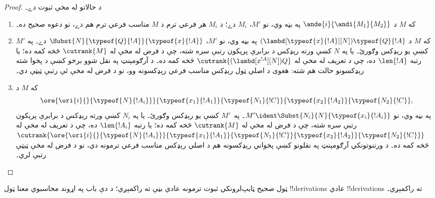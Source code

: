 \documentclass[../../../include/open-logic-section]{subfiles}
\begin{document}
\begin{proof}
  د حالاتو له مخې ثبوت دے۔
  \begin{enumerate}
  \item که $M$ د $\ande{i}{\andi{M_1}{M_2}}$ په بڼه وي، نو
    $M'$، $M_i$ دے؛ د $M_i$ هر فرعي ترم د $M$ مناسب
    فرعي ترم هم دے، نو دعوه صحيح ده۔
  \item که $M$ د
    $(\lambd[\typeof{x}{!A}][N])\typeof{Q}{!A}$ په بڼه وي، نو
    $M'$، $\Subst{N}{\typeof{Q}{!A}}{\typeof{x}{!A}}$ دے۔ په
    $M'$ کښې يو رېډکس وګورئ۔ يا په $N$ کښې ورته رېډکس
    د برابرې پرېکون رتبې سره شته، چې د فرض له مخې له
    $\cutrank{M}$ څخه کمه ده؛ يا رتبه $\len{!A}$ ده، چې
    د تعريف له مخې له $\cutrank{(\lambd[x^{!A}][N])Q}$ څخه
    کمه ده۔ د آرګومېنټ په نقل شوو برخو کښې د پخوا شته
    رېډکسونو حالت هم شته: هغوی د اصلي ټول رېډکس مناسب
    فرعي رېډکسونه وو، نو د فرض له مخې ئې رتبې ټيټې دي۔
  \item که $M$ د
    \[
    \ore{\ori{i}{}{\typeof{N}{!A_i}}}
        {\typeof{x_1}{!A_1}}{\typeof{N_1}{!C}}
        {\typeof{x_2}{!A_2}}{\typeof{N_2}{!C}},
    \]
    په بڼه وي، نو $M' \ident \Subst{N_i}{N}{\typeof{x_i}{!A_i}}$۔
    په~$M'$ کښې يو رېډکس وګورئ۔ يا په $N_i$ کښې ورته
    رېډکس د برابرې پرېکون رتبې سره شته، چې د فرض له مخې
    له $\cutrank{M}$ څخه کمه ده؛ يا رتبه $\len{!A_i}$ ده،
    چې د تعريف له مخې له
    $\cutrank{\ore{\ori{i}{}{\typeof{N}{!A_i}}}
      {\typeof{x_1}{!A_1}}{\typeof{N_1}{!C}}
      {\typeof{x_2}{!A_2}}{\typeof{N_2}{!C}}}$ څخه کمه ده۔
    د ورننوتونکي آرګومېنټ په نقلونو کښې پخواني رېډکسونه هم
    د اصلي رېډکس مناسب فرعي ترمونه دي، نو د فرض له مخې
    ټيټې رتبې لري۔
  \end{enumerate}
\end{proof}

\begin{thm}
  ټول صحيح ټايپ‌لرونکي ثبوت ترمونه عادي بڼې ته راکمېږي؛
  د دې باب په اړوند محاسبوي معنا ټول !!{derivation}s عادي
  !!{derivation}s ته راکمېږي۔
\end{thm}
\end{document}

